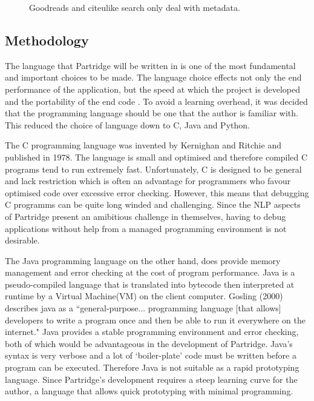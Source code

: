 \documentclass[12pt,a4paper]{article}
\begin{document}
\begin{figure}[!hbt]
        \caption{Goodreads and citeulike search only deal with metadata.}
        \label{fig:social_searches}
\end{figure}


\subsection{Methodology}

The language that Partridge will be written in is one of the most fundamental
and important choices to be made. The language choice effects not only the end
performance of the application, but the speed at which the project is developed
and the portability of the end code \cite{britton2008}. To avoid a learning
overhead, it was decided that the programming language should be one that the
author is familiar with. This reduced the choice of language down to C, Java
and Python. 

The C programming language was invented by Kernighan and Ritchie and
published in 1978\cite{ritchie1978c}. The language is small and
optimised\cite{prinz2002c} and therefore compiled C programs tend to run
extremely fast. Unfortunately, C is designed to be general and lack restriction
\cite{ricthie1978c} which is often an advantage for programmers who favour
optimised code over excessive error checking. However, this means that
debugging C programms can be quite long winded and challenging. Since the NLP
aspects of Partridge present an amibitious challenge in themselves, having to
debug applications without help from a managed programming environment is not
desirable. 

The Java programming language on the other hand, does provide memory management
and error checking\cite{Coffey2008} at the cost of program performance. Java is
a pseudo-compiled language that is translated into bytecode then interpreted at
runtime by a Virtual Machine(VM) on the client computer. Gosling (2000)
describes java as a ``general-purpose...  programming language [that allows]
developers to write a program once and then be able to run it everywhere on the
internet\cite{gosling2000java}." Java provides a stable programming environment
and error checking, both of which would be advantageous in the development of
Partridge. Java's syntax is very verbose and a lot of `boiler-plate' code must
be written before a program can be executed.  Therefore Java is not suitable as
a rapid prototyping language. Since Partridge's development requires a steep
learning curve for the author, a language that allows quick prototyping with
minimal programming.
\end{document}
